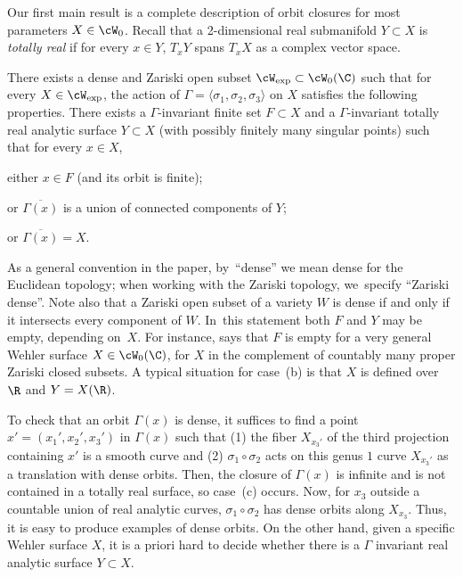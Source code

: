 Our first main result is a complete description of orbit closures for
most parameters $X\in \cW_0$.
Recall that a 2-dimensional real submanifold
$Y\subset X$ is \emph{totally real} if for every $x\in Y$, $T_xY$ spans $T_xX$ as a
complex vector space.

\begin{thm}\label{thm:orbits_wehler}
There exists a dense and Zariski open subset
$ \cW_{\mathrm{exp}}\subset \cW_0(\C)$
such that for every $X\in \cW_{\mathrm{exp}}$, the action of $\Gamma=\langle \sigma_1, \sigma_2, \sigma_3\rangle$ on $X$ satisfies the following properties. There exists
a $\Gamma$-invariant finite set $F\subset X$ and
a $\Gamma$-invariant totally real analytic surface $Y\subset X$ (with possibly finitely many singular points)
such that for {\rm{every}} $x\in X$,
\begin{enumeratea}
\item\label{thm:orbits_wehlera} either $x\in F$ (and its orbit is finite);
\item or $\overline{\Gamma(x)}$ is a union of connected components of $Y$;
\item\label{thm:orbits_wehlerb} or $\overline{\Gamma(x)} = X$.
\end{enumeratea}
\end{thm}

As a general convention in the paper, by~``dense'' we mean dense for the Euclidean topology; when working with the Zariski topology, we~specify ``Zariski dense''. Note also that a Zariski open subset of a variety
$W$ is dense if and only if it intersects every component of $W$. In~this statement both $F$ and $Y$ may be empty, depending on~$X$.
For instance, \cite[Th.\,A]{finite_orbits} says that $F$ is empty for a very general Wehler surface $X\in \cW_0(\C)$,
\ie for $X$ in the complement of countably many proper Zariski closed subsets. A typical situation for
case~(b) is that $X$ is defined over $\R$ and $Y=X(\R)$.

\begin{rem}
To check that an orbit $\Gamma(x)$ is dense, it suffices to find a point $x'=(x_1',x_2',x_3')$ in $\Gamma(x)$ such that (1) the fiber $X_{x_3'}$ of the third projection containing $x'$ is a smooth curve and (2) $\sigma_1\circ\sigma_2$ acts on this genus $1$ curve $X_{x_3'}$ as a translation with dense orbits. Then, the closure of $\Gamma(x)$ is infinite and is not contained in a totally real surface, so case~(c) occurs.
Now, for $x_3$ outside a countable union of real analytic curves, $\sigma_1\circ\sigma_2$ has dense orbits along $X_{x_3}$. Thus, it is easy to produce examples of dense orbits.
On the other hand, given a specific Wehler surface $X$, it is a priori hard to decide whether there is a $\Gamma$ invariant real analytic surface $Y\subset X$.
\end{rem}

